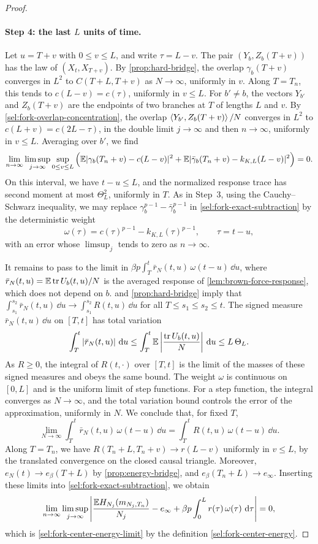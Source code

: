 \begin{proof}
\paragraph{Step 4: the last $L$ units of time.}
Let $u=T+v$ with $0\le v\le L$, and write $\tau=L-v$. The pair
$(Y_b,Z_b(T+v))$ has the law of $(X_t,X_{T+v})$. By \cref{prop:hard-bridge},
the overlap $\gamma_b(T+v)$ converges in $L^2$ to $C(T+L,T+v)$ as
$N\to\infty$, uniformly in $v$. Along $T=T_n$, this tends to $c(L-v)=c(\tau)$, uniformly in
$v\le L$. For $b'\ne b$, the vectors $Y_{b'}$ and $Z_b(T+v)$ are the
endpoints of two branches at $T$ of lengths $L$ and $v$. By
\eqref{sel:fork-overlap-concentration}, the overlap
$\left\langle Y_{b'},Z_b(T+v)\right\rangle/N$ converges in $L^2$ to $c(L+v)=c(2L-\tau)$, in the
double limit $j\to\infty$ and then $n\to\infty$, uniformly in $v\le L$.
Averaging over $b'$, we find
\[
 \lim_{n\to\infty}\limsup_{j\to\infty}\sup_{0\le v\le L}
 \Big(\mathbb E|\gamma_b(T_n+v)-c(L-v)|^2
 +\mathbb E|\bar\gamma_b(T_n+v)-k_{K,L}(L-v)|^2\Big)=0.
\]
On this interval, we have $t-u\le L$, and the normalized response trace has second moment at most $\Theta_L^2$, uniformly in $T$. As in Step~3, using the Cauchy--Schwarz inequality, we may replace $\gamma_b^{p-1}-\bar\gamma_b^{p-1}$ in
\eqref{sel:fork-exact-subtraction} by the deterministic weight
\[
 \omega(\tau)=c(\tau)^{p-1}-k_{K,L}(\tau)^{p-1},\qquad\tau=t-u,
\]
with an error whose $\limsup_j$ tends to zero as $n\to\infty$.

It remains to pass to the limit in
$\beta p\int_T^t\bar r_N(t,u)\,\omega(t-u)\,\dd u$, where
$\bar r_N(t,u)=\mathbb E\operatorname{tr} U_b(t,u)/N$ is the averaged response of
\cref{lem:brown-force-response}, which does not depend on $b$.
 and \cref{prop:hard-bridge} imply that
$\int_{s_1}^{s_2}\bar r_N(t,u)\,\dd u\to\int_{s_1}^{s_2}R(t,u)\,\dd u$
for all $T\le s_1\le s_2\le t$. The signed measure $\bar r_N(t,u)\,\dd u$ on
$[T,t]$ has total variation
\[
 \int_T^t|\bar r_N(t,u)|\,\mathop{}\!\mathrm d u
 \le\int_T^t\mathbb E\left|\frac{\operatorname{tr} U_b(t,u)}N\right|\,\mathop{}\!\mathrm d u
 \le L\,\Theta_L.
\]
As $R\ge0$, the integral of $R(t,\cdot)$ over $[T,t]$ is the limit of the
masses of these signed measures and obeys the same bound. The weight $\omega$ is continuous on $[0,L]$ and
is the uniform limit of step functions. For a step function, the integral converges as $N\to\infty$, and the total variation bound controls the error
of the approximation, uniformly in $N$. We conclude that, for fixed $T$,
\[
 \lim_{N\to\infty}\int_T^t\bar r_N(t,u)\,\omega(t-u)\,\dd u
 =\int_T^tR(t,u)\,\omega(t-u)\,\dd u.
\]
Along $T=T_n$, we have $R(T_n+L,T_n+v)\to r(L-v)$ uniformly in $v\le L$, by
the translated convergence on the closed causal triangle. Moreover,
$e_N(t)\to e_\beta(T+L)$ by \cref{prop:energy-bridge}, and
$e_\beta(T_n+L)\to e_\infty$. Inserting these limits into
\eqref{sel:fork-exact-subtraction}, we obtain
\[
 \lim_{n\to\infty}\limsup_{j\to\infty}
 \left|\frac{\mathbb E H_{N_j}(m_{N_j,T_n})}{N_j}
 -e_\infty+\beta p\int_0^Lr(\tau)\,\omega(\tau)\,\mathop{}\!\mathrm d\tau\right|=0,
\]
which is \eqref{sel:fork-center-energy-limit} by the definition
\eqref{sel:fork-center-energy}.


\end{proof}
